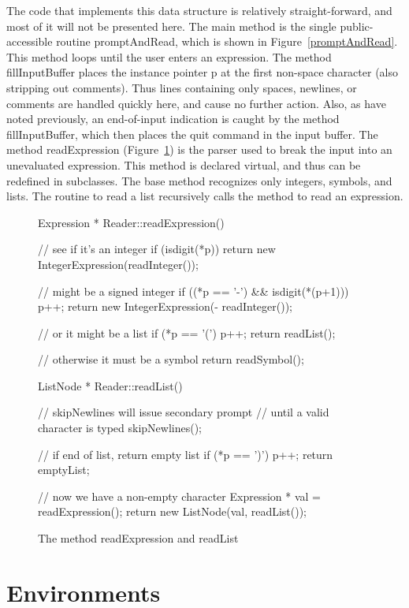 The code that implements this data structure is relatively
straight-forward, and most of it will not be presented here.
The main method is the
single public-accessible routine {\sf promptAndRead}, which is shown in
Figure~\ref{promptAndRead}.  
This method loops until the user enters an expression.  The method
{\sf fillInputBuffer} places the instance pointer {\sf p} at the first 
non-space character (also stripping out comments).   Thus lines containing 
only spaces,
newlines, or comments are handled quickly here, and cause no further
action.  Also, as have noted previously, an end-of-input indication is
caught by the method {\sf fillInputBuffer}, which then places the 
{\sf quit} command in the input buffer.
The method {\sf readExpression} (Figure~\ref{readExpression}) is the parser 
used to break the input into
an unevaluated expression.  This method is declared {\sf virtual}, and thus
can be redefined in subclasses.  The base method recognizes only integers,
symbols, and lists.   The routine to read a list recursively calls the
method to read an expression.

\begin{figure}
\begin{cprog}
Expression * Reader::readExpression()
{
	// see if it's an integer
	if (isdigit(*p))
		return new IntegerExpression(readInteger());

	// might be a signed integer
	if ((*p == '-') && isdigit(*(p+1))) {
		p++;
		return new IntegerExpression(- readInteger());
		}

	// or it might be a list
	if (*p == '(') {
		p++;
		return readList();
		}
	
	// otherwise it must be a symbol
	return readSymbol();
}

ListNode * Reader::readList()
{
	// skipNewlines will issue secondary prompt
	// until a valid character is typed
	skipNewlines();

	// if end of list, return empty list
	if (*p == ')') {
		p++;
		return emptyList;
		}

	// now we have a non-empty character
	Expression * val = readExpression();
	return new ListNode(val, readList());
}
\end{cprog}
\caption{The method {\sf readExpression} and {\sf readList}}\label{readExpression}
\end{figure}

\section{Environments}

